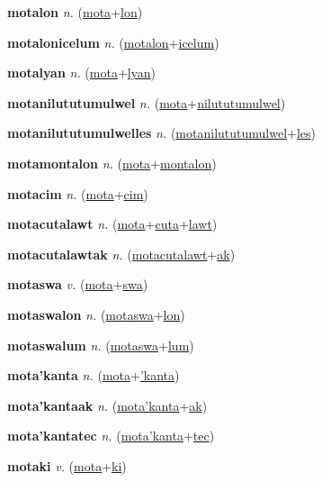 \textbf{\hypertarget{motalon}{motalon}} \textit{n.} (\hyperlink{mota}{mota}+\allowbreak \hyperlink{lon}{lon})


\textbf{\hypertarget{motalonicelum}{motalonicelum}} \textit{n.} (\hyperlink{motalon}{motalon}+\allowbreak \hyperlink{icelum}{icelum})


\textbf{\hypertarget{motalyan}{motalyan}} \textit{n.} (\hyperlink{mota}{mota}+\allowbreak \hyperlink{lyan}{lyan})


\textbf{\hypertarget{motanilututumulwel}{motanilututumulwel}} \textit{n.} (\hyperlink{mota}{mota}+\allowbreak \hyperlink{nilututumulwel}{nilututumulwel})


\textbf{\hypertarget{motanilututumulwelles}{motanilututumulwelles}} \textit{n.} (\hyperlink{motanilututumulwel}{motanilututumulwel}+\allowbreak \hyperlink{les}{les})


\textbf{\hypertarget{motamontalon}{motamontalon}} \textit{n.} (\hyperlink{mota}{mota}+\allowbreak \hyperlink{montalon}{montalon})


\textbf{\hypertarget{motacim}{motacim}} \textit{n.} (\hyperlink{mota}{mota}+\allowbreak \hyperlink{cim}{cim})


\textbf{\hypertarget{motacutalawt}{motacutalawt}} \textit{n.} (\hyperlink{mota}{mota}+\allowbreak \hyperlink{cuta}{cuta}+\allowbreak \hyperlink{lawt}{lawt})


\textbf{\hypertarget{motacutalawtak}{motacutalawtak}} \textit{n.} (\hyperlink{motacutalawt}{motacutalawt}+\allowbreak \hyperlink{ak}{ak})


\textbf{\hypertarget{motaswa}{motaswa}} \textit{v.} (\hyperlink{mota}{mota}+\allowbreak \hyperlink{swa}{swa})


\textbf{\hypertarget{motaswalon}{motaswalon}} \textit{n.} (\hyperlink{motaswa}{motaswa}+\allowbreak \hyperlink{lon}{lon})


\textbf{\hypertarget{motaswalum}{motaswalum}} \textit{n.} (\hyperlink{motaswa}{motaswa}+\allowbreak \hyperlink{lum}{lum})


\textbf{\hypertarget{mota'kanta}{mota'kanta}} \textit{n.} (\hyperlink{mota}{mota}+\allowbreak \hyperlink{'kanta}{'kanta})


\textbf{\hypertarget{mota'kantaak}{mota'kantaak}} \textit{n.} (\hyperlink{mota'kanta}{mota'kanta}+\allowbreak \hyperlink{ak}{ak})


\textbf{\hypertarget{mota'kantatec}{mota'kantatec}} \textit{n.} (\hyperlink{mota'kanta}{mota'kanta}+\allowbreak \hyperlink{tec}{tec})


\textbf{\hypertarget{motaki}{motaki}} \textit{v.} (\hyperlink{mota}{mota}+\allowbreak \hyperlink{ki}{ki})



